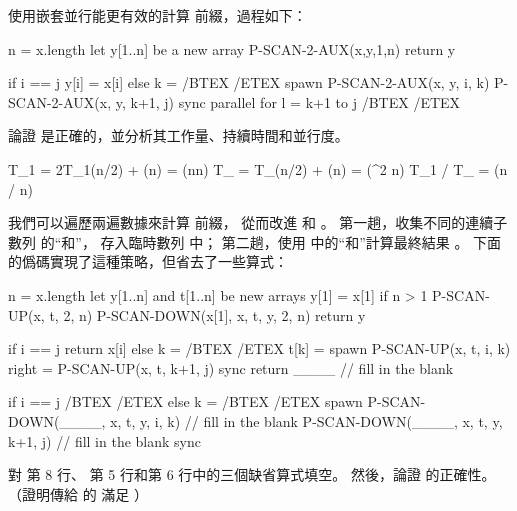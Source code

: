 使用嵌套並行能更有效的計算 \m{\otimes} 前綴，過程如下：

\startCLRS
n = x.length
let y[1..n] be a new array
P-SCAN-2-AUX(x,y,1,n)
return y
\stopCLRS

\startCLRS
if i == j
	y[i] = x[i]
else
	k = /BTEX  /ETEX
	spawn P-SCAN-2-AUX(x, y, i, k)
	P-SCAN-2-AUX(x, y, k+1, j)
	sync
	parallel for l = k+1 to j
		/BTEX  /ETEX
\stopCLRS

\startigBase[continue]\startitem
論證  是正確的，並分析其工作量、持續時間和並行度。
\stopitem\stopigBase

\startANSWER
\startformula\startmathalignment
\NC T_1 \NC = 2T_1(n/2) + \Theta(n) = \Theta(n\lg n) \NR
\NC T_{\infty} \NC = T_{\infty}(n/2) + \Theta(\lg n) = \Theta(\lg^2 n) \NR
\NC T_1 / T_{\infty} \NC = \Theta(n / \lg n) \NR
\stopmathalignment\stopformula
\stopANSWER

我們可以遍歷兩遍數據來計算 \m{\otimes} 前綴，
從而改進  和 。
第一趟，收集不同的連續子數列  的“和”，
存入臨時數列  中；
第二趟，使用  中的“和”計算最終結果 。
下面的僞碼實現了這種策略，但省去了一些算式：

\startCLRS
n = x.length
let y[1..n] and t[1..n] be new arrays
y[1] = x[1]
if n > 1
	P-SCAN-UP(x, t, 2, n)
	P-SCAN-DOWN(x[1], x, t, y, 2, n)
return y
\stopCLRS

\startCLRS
if i == j
	return x[i]
else
	k = /BTEX  /ETEX
	t[k] = spawn P-SCAN-UP(x, t, i, k)
	right = P-SCAN-UP(x, t, k+1, j)
	sync
	return ____		// fill in the blank
\stopCLRS

\startCLRS
if i == j
	/BTEX  /ETEX
else
	k = /BTEX /ETEX
	spawn P-SCAN-DOWN(____, x, t, y, i, k)		// fill in the blank
	P-SCAN-DOWN(____, x, t, y, k+1, j)		// fill in the blank
	sync
\stopCLRS

\startigBase[continue]\startitem
對  第 8 行、  第 5 行和第 6 行中的三個缺省算式填空。
然後，論證  的正確性。
（\hint 證明傳給  的  滿足 ）
\stopitem\stopigBase

\startANSWER
{}


\stopANSWER

